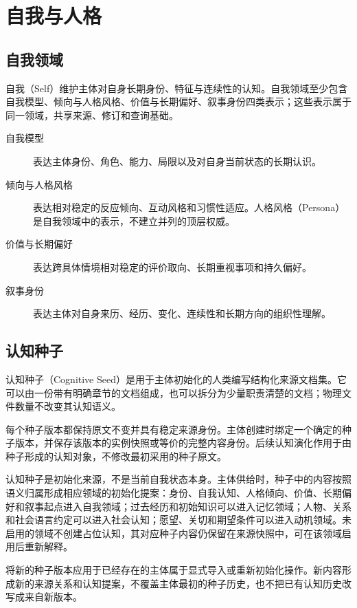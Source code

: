 \chapter{自我与人格}

\section{自我领域}

自我（Self）维护主体对自身长期身份、特征与连续性的认知。自我领域至少包含自我模型、倾向与人格风格、价值与长期偏好、叙事身份四类表示；这些表示属于同一领域，共享来源、修订和查询基础。

\begin{description}
\item[自我模型] 表达主体身份、角色、能力、局限以及对自身当前状态的长期认识。
\item[倾向与人格风格] 表达相对稳定的反应倾向、互动风格和习惯性适应。人格风格（Persona）是自我领域中的表示，不建立并列的顶层权威。
\item[价值与长期偏好] 表达跨具体情境相对稳定的评价取向、长期重视事项和持久偏好。
\item[叙事身份] 表达主体对自身来历、经历、变化、连续性和长期方向的组织性理解。
\end{description}

\section{认知种子}

认知种子（Cognitive Seed）是用于主体初始化的人类编写结构化来源文档集。它可以由一份带有明确章节的文档组成，也可以拆分为少量职责清楚的文档；物理文件数量不改变其认知语义。

每个种子版本都保持原文不变并具有稳定来源身份。主体创建时绑定一个确定的种子版本，并保存该版本的实例快照或等价的完整内容身份。后续认知演化作用于由种子形成的认知对象，不修改最初采用的种子原文。

认知种子是初始化来源，不是当前自我状态本身。主体供给时，种子中的内容按照语义归属形成相应领域的初始化提案：身份、自我认知、人格倾向、价值、长期偏好和叙事起点进入自我领域；过去经历和初始知识可以进入记忆领域；人物、关系和社会语言约定可以进入社会认知；愿望、关切和期望条件可以进入动机领域。未启用的领域不创建占位认知，其对应种子内容仍保留在来源快照中，可在该领域启用后重新解释。

将新的种子版本应用于已经存在的主体属于显式导入或重新初始化操作。新内容形成新的来源关系和认知提案，不覆盖主体最初的种子历史，也不把已有认知历史改写成来自新版本。

